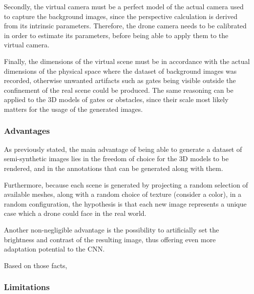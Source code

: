 Secondly, the virtual camera must be a perfect model of the actual camera used
to capture the background images, since the perspective calculation is derived
from its intrinsic parameters. Therefore, the drone camera needs to be
calibrated in order to estimate its parameters, before being able to apply
them to the virtual camera.

Finally, the dimensions of the virtual scene must be in accordance with the
actual dimensions of the physical space where the dataset of background images
was recorded, otherwise unwanted artifacts such as gates being visible outside
the confinement of the real scene could be produced. The same reasoning can be
applied to the 3D models of gates or obstacles, since their scale most likely
matters for the usage of the generated images.\\

	\subsubsection{Advantages}

As previously stated, the main advantage of being able to generate a dataset of
semi-synthetic images lies in the freedom of choice for the 3D models to be
rendered, and in the annotations that can be generated along with them.

Furthermore, because each scene is generated by projecting a random selection
of available meshes, along with a random choice of texture (consider a color),
in a random configuration, the hypothesis is that each new image represents a
unique case which a drone could face in the real world.

Another non-negligible  advantage is the possibility to artificially set the
brightness and contrast of the resulting image, thus offering even more
adaptation potential to the CNN.

Based on those facts, 

	\subsubsection{Limitations}
